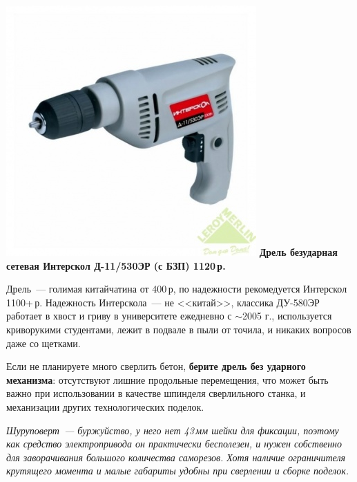 \documentclass{magazine}
\begin{document}
\begin{multicols}{2}
\noindent\href{http://leroymerlin.ru/catalogue/instrumenty/elektroinstrument/dreli\_bezudarnye/11857763/}{
\includegraphics[width=\columnwidth]{fig/00/D_11_530ER.jpg}}
\textbf{Дрель безударная сетевая Интерскол Д-11/530ЭР (с БЗП) 1120\,р.}

Дрель\ --- голимая китайчатина от 400\,р, по надежности рекомедуется Интерскол
1100+\,р. Надежность Интерскола\ --- не <<китай>>, классика ДУ-580ЭР
работает в хвост и гриву в университете ежедневно с $\sim$2005 г., используется
криворукими студентами, лежит в подвале в пыли от точила, и никаких вопросов
даже со щетками.

Если не планируете много сверлить бетон, \textbf{берите дрель без ударного
механизма}: отсутствуют лишние продольные перемещения, что может быть важно при
использовании в качестве шпинделя сверлильного станка, и механизации других
технологических поделок.

\emph{Шуруповерт\ --- буржуйство, у него нет 43\,мм шейки для фиксации, поэтому
как средство электропривода он практически бесполезен, и нужен собственно для
заворачивания большого количества саморезов. Хотя наличие ограничителя
крутящего момента и малые габариты удобны при сверлении и сборке поделок.}


\end{multicols}
\end{document}
